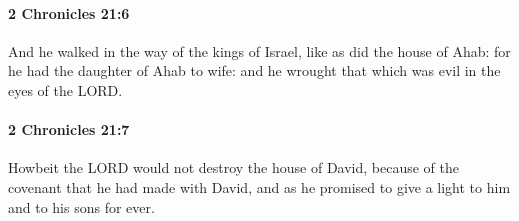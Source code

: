 		\paragraph{2 Chronicles 21:6} %
			\label{2CHRONICLES-21-6}

			And he walked in the way of the kings of Israel, like as did the house of Ahab: for he had the daughter of Ahab to wife: and he wrought that which was evil in the eyes of the LORD.


		\paragraph{2 Chronicles 21:7} %
			\label{2CHRONICLES-21-7}

			Howbeit the LORD would not destroy the house of David, because of the covenant that he had made with David, and as he promised to give a light to him and to his sons for ever.

